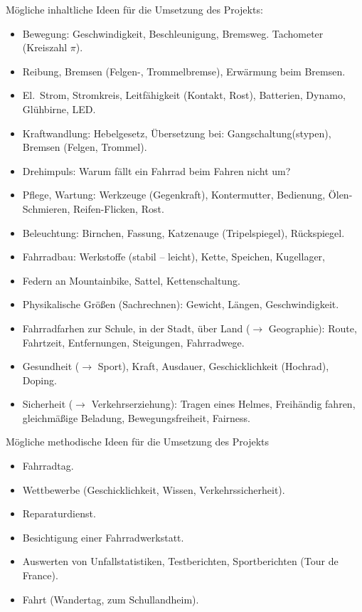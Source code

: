 
M\"{o}gliche inhaltliche Ideen f\"{u}r die Umsetzung des Projekts:
\begin{itemize} %
\item
Bewegung: Geschwindigkeit, Beschleunigung, Bremsweg.
Tachometer (Kreiszahl $\pi$).
\item
Reibung, Bremsen (Felgen-, Trommelbremse),
Erw\"{a}rmung beim Bremsen.
\item
El.\ Strom, Stromkreis, Leitf\"{a}higkeit (Kontakt, Rost), Batterien,
Dynamo, Gl\"{u}hbirne, LED.
\item
Kraftwandlung: Hebelgesetz, \"{U}bersetzung bei: Gangschaltung(stypen),
Bremsen (Felgen, Trommel).
\item
Drehimpuls: Warum f\"{a}llt ein Fahrrad beim Fahren nicht um?
\item
Pflege, Wartung: Werkzeuge (Gegenkraft), Kontermutter,
Bedienung, \"{O}len-Schmieren, Reifen-Flicken, Rost.
\item
Beleuchtung: Birnchen, Fassung, Katzenauge
(Tripelspiegel), R\"{u}ckspiegel.
\item
Fahrradbau: Werkstoffe (stabil -- leicht),
Kette, Speichen, Kugellager,
\item
Federn an Mountainbike, Sattel, Kettenschaltung.
\item
Physikalische Gr\"{o}{\ss}en (Sachrechnen): Gewicht, L\"{a}ngen,
Geschwindigkeit.
\item
Fahrradfarhen zur Schule, in der Stadt, \"{u}ber Land
($\to$ Geographie):
Route, Fahrtzeit, Entfernungen, Steigungen, Fahrradwege.
\item
Gesundheit ($\to$ Sport), Kraft, Ausdauer, Geschicklichkeit
(Hochrad), Doping.
\item
Sicherheit ($\to$ Verkehrserziehung): Tragen eines Helmes,
Freih\"{a}ndig fahren,
gleichm\"{a}{\ss}ige Beladung, Bewegungsfreiheit, Fairness.
\end{itemize}

M\"{o}gliche methodische Ideen f\"{u}r die Umsetzung des Projekts
\begin{itemize}
\item
Fahrradtag.
\item
Wettbewerbe (Geschicklichkeit, Wissen, Verkehrssicherheit).
\item
Reparaturdienst.
\item
Besichtigung einer Fahrradwerkstatt.
\item
Auswerten von Unfallstatistiken, Testberichten, Sportberichten
(Tour de France).
\item
Fahrt (Wandertag, zum Schullandheim).
\end{itemize}


